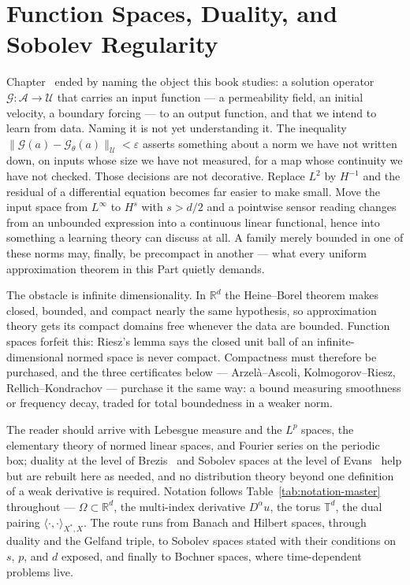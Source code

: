 
\chapter{Function Spaces, Duality, and Sobolev Regularity}
\label{ch:part1-function-spaces-duality-and-sobolev-regula}
\label{sec:function_spaces}

Chapter~ ended by naming the object this book studies: a solution operator $\mathcal{G} : \mathcal{A} \to \mathcal{U}$ that carries an input function --- a permeability field, an initial velocity, a boundary forcing --- to an output function, and that we intend to learn from data. Naming it is not yet understanding it. The inequality $\|\mathcal{G}(a) - \mathcal{G}_\theta(a)\|_{\mathcal{U}} < \varepsilon$ asserts something about a norm we have not written down, on inputs whose size we have not measured, for a map whose continuity we have not checked. Those decisions are not decorative. Replace $L^2$ by $H^{-1}$ and the residual of a differential equation becomes far easier to make small. Move the input space from $L^\infty$ to $H^s$ with $s > d/2$ and a pointwise sensor reading changes from an unbounded expression into a continuous linear functional, hence into something a learning theory can discuss at all. A family merely bounded in one of these norms may, finally, be precompact in another --- what every uniform approximation theorem in this Part quietly demands.

The obstacle is infinite dimensionality. In $\mathbb{R}^d$ the Heine--Borel theorem makes closed, bounded, and compact nearly the same hypothesis, so approximation theory gets its compact domains free whenever the data are bounded. Function spaces forfeit this: Riesz's lemma says the closed unit ball of an infinite-dimensional normed space is never compact. Compactness must therefore be purchased, and the three certificates below --- Arzel\`a--Ascoli, Kolmogorov--Riesz, Rellich--Kondrachov --- purchase it the same way: a bound measuring smoothness or frequency decay, traded for total boundedness in a weaker norm.

The reader should arrive with Lebesgue measure and the $L^p$ spaces, the elementary theory of normed linear spaces, and Fourier series on the periodic box; duality at the level of Brezis~\cite{brezis2011functional} and Sobolev spaces at the level of Evans~\cite{evans2010partial} help but are rebuilt here as needed, and no distribution theory beyond one definition of a weak derivative is required. Notation follows Table~\ref{tab:notation-master} throughout --- $\Omega \subset \mathbb{R}^d$, the multi-index derivative $D^\alpha u$, the torus $\mathbb{T}^d$, the dual pairing $\langle \cdot, \cdot \rangle_{X^*, X}$. The route runs from Banach and Hilbert spaces, through duality and the Gelfand triple, to Sobolev spaces stated with their conditions on $s$, $p$, and $d$ exposed, and finally to Bochner spaces, where time-dependent problems live.


